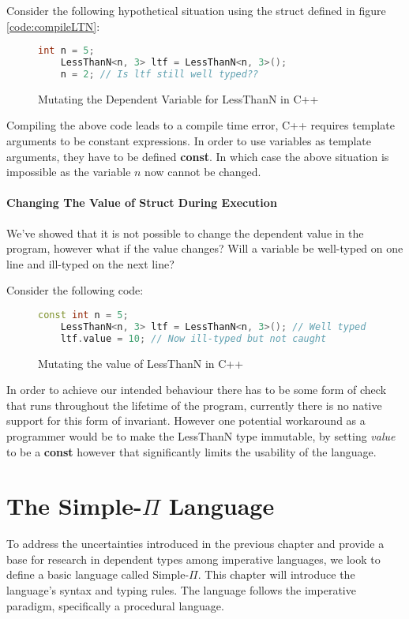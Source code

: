 \documentclass[a4paper,12pt]{report}
\begin{document}
\par
Consider the following hypothetical situation using the struct defined in 
figure \ref{code:compileLTN}: 

\begin{figure}[H]
  \begin{lstlisting}[language=c++]     
    int n = 5;
    LessThanN<n, 3> ltf = LessThanN<n, 3>();
    n = 2; // Is ltf still well typed??
  \end{lstlisting}
  \caption{Mutating the Dependent Variable for LessThanN in C++}
\end{figure}

\par
Compiling the above code leads to a compile time error, C++ requires template 
arguments to be constant expressions. In order to use variables as template 
arguments, they have to be defined \textbf{const}. In which case the above 
situation is impossible as the variable $n$ now cannot be changed. 

\subsubsection{Changing The Value of Struct During Execution}
We've showed that it is not possible to change the dependent value in 
the program, however what if the value changes? Will a 
variable be well-typed on one line and ill-typed on the next line? 

\par
Consider the following code: 
\begin{figure}[H]
  \begin{lstlisting}[language=c++]     
    const int n = 5;
    LessThanN<n, 3> ltf = LessThanN<n, 3>(); // Well typed
    ltf.value = 10; // Now ill-typed but not caught
  \end{lstlisting}
  \caption{Mutating the value of LessThanN in C++}
\end{figure}

\par
In order to achieve our intended behaviour there has to be some form of check 
that runs throughout the lifetime of the program, currently there is no native 
support for this form of invariant. However one potential workaround as a 
programmer would be to make the LessThanN type immutable, by setting \textit{value} 
to be a \textbf{const} however that significantly limits the usability of the 
language. 

\chapter{The Simple-$\Pi$ Language}
To address the uncertainties introduced in the previous chapter and provide a 
base for research in dependent types among imperative languages, we look to 
define a basic language called Simple-$\Pi$. This chapter will introduce 
the language's syntax and typing rules. The language follows 
the imperative paradigm, specifically a procedural language.
\end{document}
